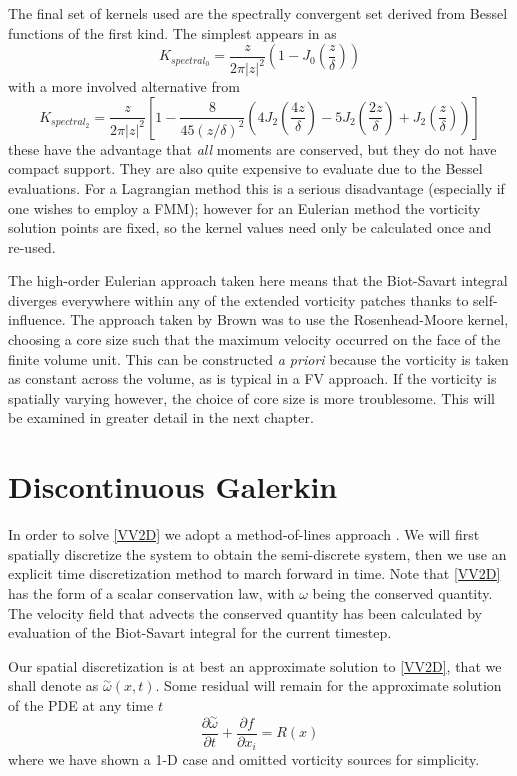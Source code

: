 \documentclass[letterpaper,12pt]{report}
\newcommand{\ben}[1]{\begin{equation}\label{#1}}
\newcommand{\ee}{\end{equation}}
\newcommand{\aomega}{\overset{\sim}{\omega}}				%
\begin{document}
The final set of kernels used are the spectrally convergent set derived from Bessel functions of the first kind. The simplest appears in \cite{WL} as
\ben{PSkern}  K_{spectral_0}= \frac{z}{2 \pi |z|^2} (1-J_0(\frac{z}{\delta})) \ee
with a more involved alternative from \cite{HaldReview}
\ben{PSkern}  K_{spectral_2}= \frac{z}{2 \pi |z|^2} \left[1-\frac{8}{45(z/\delta)^2}(4J_2(\frac{4z}{\delta})-5J_2(\frac{2z}{\delta})+J_2(\frac{z}{\delta}))\right] \ee
these have the advantage that \textit{all} moments are conserved, but they do not have compact support. They are also quite expensive to evaluate due to the Bessel evaluations. For a Lagrangian method this is a serious disadvantage (especially if one wishes to employ a FMM); however for an Eulerian method the vorticity solution points are fixed, so the kernel values need only be calculated once and re-used.

The high-order Eulerian approach taken here means that the Biot-Savart integral diverges everywhere within any of the extended vorticity patches thanks to self-influence. The approach taken by Brown \cite{Brown2004} was to use the Rosenhead-Moore kernel, choosing a core size such that the maximum velocity occurred on the face of the finite volume unit. This can be constructed \textit{a priori} because the vorticity is taken as constant across the volume, as is typical in a FV approach. If the vorticity is spatially varying however, the choice of core size is more troublesome. This will be examined in greater detail in the next chapter.

\section{Discontinuous Galerkin}
In order to solve \eqref{VV2D} we adopt a method-of-lines approach \cite{RKDG}. We will first spatially discretize the system to obtain the semi-discrete system, then we use an explicit time discretization method to march forward in time. Note that \eqref{VV2D} has the form of a scalar conservation law, with $\omega$ being the conserved quantity. The velocity field that advects the conserved quantity has been calculated by evaluation of the Biot-Savart integral for the current timestep.

Our spatial discretization is at best an approximate solution to \eqref{VV2D}, that we shall denote as $\aomega(x,t)$. Some residual will remain for the approximate solution of the PDE at any time $t$
\ben{VV2D} \frac{\partial \aomega}{\partial t} + \frac{\partial f}{\partial x_i} = R(x)\ee
where we have shown a 1-D case and omitted vorticity sources for simplicity.
\end{document}
